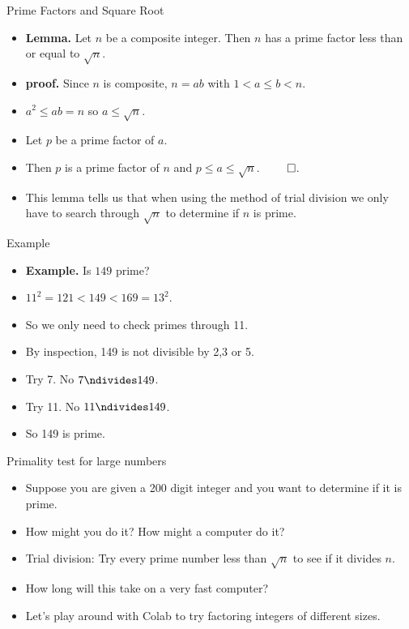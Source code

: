 \documentclass[handout]{beamer}
\begin{document}
\begin{frame}{Prime Factors and Square Root}

\begin{itemize}
  \item \textbf{Lemma.} Let $n$ be a composite integer. Then $n$ has a prime factor less than or equal to $\sqrt{n}$.
  \item \textbf{proof.} Since $n$ is composite, $n=ab$ with $1<a\leq b < n$.
  \item $a^2 \leq ab = n$ so $a \leq \sqrt{n}$.
  \item Let $p$ be a prime factor of $a$.
  \item Then $p$ is a prime factor of $n$ and $p\leq a \leq \sqrt{n}$. $\qed$.
  \item This lemma tells us that when using the method of trial division we only
  have to search through $\sqrt{n}$ to determine if $n$ is prime.
\end{itemize}
\end{frame}

\begin{frame}{Example}
\begin{itemize}
  \item \textbf{Example.} Is $149$ prime?
  \item $11^2 = 121 < 149 < 169 = 13^2$.
  \item So we only need to check primes through 11.
  \item By inspection, 149 is not divisible by 2,3 or 5.
  \item Try 7. No $7\ndivides 149$.
  \item Try 11. No $11\ndivides 149$.
  \item So 149 is prime.
\end{itemize}
\end{frame}

\begin{frame}{Primality test for large numbers}
\begin{itemize}
  \item Suppose you are given a 200 digit integer  and you want to determine if it is prime.
  \item How might you do it? How might a computer do it?
  \item Trial division: Try every prime number less than $\sqrt{n}$ to see if it divides $n$.
  \item How long will this take on a very fast computer?
  \item Let's play around with Colab to try factoring integers of different sizes.
\end{itemize}
\end{frame}
\end{document}
